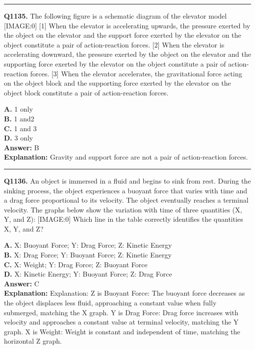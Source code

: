 \documentclass[12pt]{article}
\begin{document}
\hrule
\vspace{1em}


\noindent
\textbf{Q1135.} The following figure is a schematic diagram of the elevator model
[IMAGE:0]
[1]
When the elevator is accelerating upwards, the pressure exerted by the object on the elevator and the support force exerted by the elevator on the object constitute a pair of action-reaction forces.
[2]
When the elevator is accelerating downward, the pressure exerted by the object on the elevator and the supporting force exerted by the elevator on the object constitute a pair of action-reaction forces.
[3]
When the elevator accelerates, the gravitational force acting on the object block and the supporting force exerted by the elevator on the object block constitute a pair of action-reaction forces.



\textbf{A.} 1 only \\
\textbf{B.} 1 and2 \\
\textbf{C.} 1 and 3 \\
\textbf{D.} 3 only \\

\textbf{Answer:} B \\
\textbf{Explanation:} Gravity and support force are not a pair of action-reaction forces.

\hrule
\vspace{1em}


\noindent
\textbf{Q1136.} An object is immersed in a fluid and begins to sink from rest. During the sinking process, the object experiences a buoyant force that varies with time and a drag force proportional to its velocity. The object eventually reaches a terminal velocity. The graphs below show the variation with time of three quantities (X, Y, and Z):
[IMAGE:0]
Which line in the table correctly identifies the quantities X, Y, and Z?



\textbf{A.} X: Buoyant Force; Y: Drag Force; Z: Kinetic Energy \\
\textbf{B.} X: Drag Force; Y: Buoyant Force; Z: Kinetic Energy \\
\textbf{C.} X: Weight; Y: Drag Force; Z: Buoyant Force \\
\textbf{D.} X: Kinetic Energy; Y: Buoyant Force; Z: Drag Force \\

\textbf{Answer:} C \\
\textbf{Explanation:} Explanation:
Z is Buoyant Force: The buoyant force decreases as the object displaces less fluid, approaching a constant value when fully submerged, matching the X graph.
Y is Drag Force: Drag force increases with velocity and approaches a constant value at terminal velocity, matching the Y graph.
X is Weight: Weight is constant and independent of time, matching the horizontal Z graph.
\end{document}
